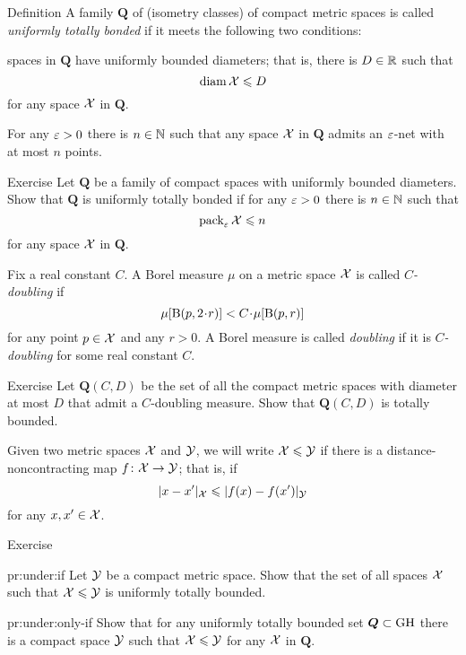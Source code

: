 \begin{thm}{Definition}\label{def:utb}
A family $\bm{Q}$ of (isometry classes) of compact metric spaces is called  \emph{uniformly totally bonded} if it meets the following two conditions:

\begin{subthm}{}
spaces in $\bm{Q}$ have uniformly bounded diameters; that is, there is $D\in\mathbb{R}$ such that
\[\operatorname{\rm diam}\nolimits\mathcal{X}\leqslant D\]
for any space $\mathcal{X}$ in $\bm{Q}$.
\end{subthm}

\begin{subthm}{}
For any $\varepsilon>0$ there is $n\in\mathbb{N}$ such that any space $\mathcal{X}$ in $\bm{Q}$ admits an $\varepsilon$-net with at most $n$ points.
\end{subthm}
\end{thm}

\begin{thm}{Exercise}\label{ex:utb+pack}
Let $\bm{Q}$ be a family of compact spaces with uniformly bounded diameters.
Show that $\bm{Q}$ is uniformly totally bonded if for any $\varepsilon>0$ there is $n\in\mathbb{N}$ such that 
\[\operatorname{\rm pack}\nolimits_\varepsilon\mathcal{X}\leqslant n\]
for any space $\mathcal{X}$ in $\bm{Q}$.
\end{thm}


Fix a real constant $C$.
A Borel measure $\mu$ on a metric space $\mathcal{X}$ is called \emph{$C$-doubling} if
\[\mu[\oBall(p,2\cdot r)]< C\cdot\mu[\oBall(p,r)]\]
for any point $p\in \mathcal{X}$ and any $r>0$.
A Borel measure is called \emph{doubling} if it is {}\emph{$C$-doubling} for some real constant $C$.

\begin{thm}{Exercise}\label{pr:doubling}
Let $\bm{Q}(C,D)$ be the set of all the compact metric spaces with diameter at most $D$ that admit a $C$-doubling measure.
Show that $\bm{Q}(C,D)$ is totally bounded.
\end{thm}

Given two metric spaces $\mathcal{X}$ and $\mathcal{Y}$, we will write $\mathcal{X}\leqslant \mathcal{Y}$ if there is a distance-noncontracting map $f\colon\mathcal{X}\to \mathcal{Y}$;
that is, if 
$$ |x-x'|_{\mathcal{X}}\leqslant|f(x)-f(x')|_{\mathcal{Y}}$$
for any $x,x'\in \mathcal{X}$.

\begin{thm}{Exercise}\label{pr:under}

\begin{subthm}{pr:under:if}
Let $\mathcal{Y}$ be a compact metric space.
Show that the set of all spaces $\mathcal{X}$ such that $\mathcal{X}\leqslant\mathcal{Y}$
is uniformly totally bounded.
\end{subthm}

\begin{subthm}{pr:under:only-if}
Show that for any uniformly totally bounded set $\bm{Q}\subset\operatorname{\rm GH}\nolimits$ there is a compact space $\mathcal{Y}$
such that $\mathcal{X}\leqslant\mathcal{Y}$ for any $\mathcal{X}$ in $\bm{Q}$.
\end{subthm}

\end{thm}

